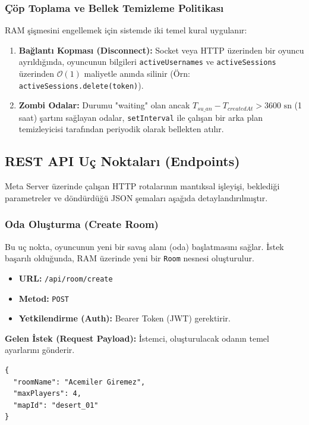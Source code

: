 \documentclass[12pt,a4paper]{article}
\begin{document}
\subsubsection{Çöp Toplama ve Bellek Temizleme Politikası}
RAM şişmesini engellemek için sistemde iki temel kural uygulanır:
\begin{enumerate}
      \item \textbf{Bağlantı Kopması (Disconnect):} Socket veya HTTP üzerinden bir oyuncu ayrıldığında, oyuncunun bilgileri \texttt{activeUsernames} ve \texttt{activeSessions} üzerinden $\mathcal{O}(1)$ maliyetle anında silinir (Örn: \texttt{activeSessions.delete(token)}).
      \item \textbf{Zombi Odalar:} Durumu "waiting" olan ancak $T_{su\_an} - T_{createdAt} > 3600\text{ sn}$ (1 saat) şartını sağlayan odalar, \texttt{setInterval} ile çalışan bir arka plan temizleyicisi tarafından periyodik olarak bellekten atılır.
\end{enumerate}
\subsection{REST API Uç Noktaları (Endpoints)}

Meta Server üzerinde çalışan HTTP rotalarının mantıksal işleyişi, beklediği parametreler ve döndürdüğü JSON şemaları aşağıda detaylandırılmıştır.

\subsubsection{Oda Oluşturma (Create Room)}
Bu uç nokta, oyuncunun yeni bir savaş alanı (oda) başlatmasını sağlar. İstek başarılı olduğunda, RAM üzerinde yeni bir \texttt{Room} nesnesi oluşturulur.

\begin{itemize}
      \item \textbf{URL:} \texttt{/api/room/create}
      \item \textbf{Metod:} \texttt{POST}
      \item \textbf{Yetkilendirme (Auth):} Bearer Token (JWT) gerektirir.
\end{itemize}

\textbf{Gelen İstek (Request Payload):}
İstemci, oluşturulacak odanın temel ayarlarını gönderir.
\begin{verbatim}
{
  "roomName": "Acemiler Giremez",
  "maxPlayers": 4,
  "mapId": "desert_01"
}
\end{verbatim}
\end{document}
